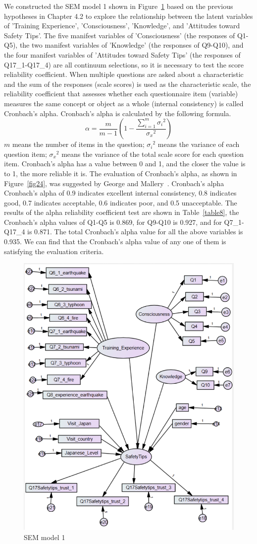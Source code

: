 We constructed the SEM model 1 shown in Figure~\ref{fig23} based on the previous hypotheses in Chapter 4.2 to explore the relationship between the latent variables of 'Training Experience', 'Consciousness', 'Knowledge', and 'Attitudes toward Safety Tips'. The five manifest variables of 'Consciousness' (the responses of Q1-Q5), the two manifest variables of 'Knowledge' (the responses of Q9-Q10), and the four manifest variables of  'Attitudes toward Safety Tips' (the responses of Q17\_1-Q17\_4) are all continuum selections, so it is necessary to test the score reliability coefficient. When multiple questions are asked about a characteristic and the sum of the responses (scale scores) is used as the characteristic scale, the reliability coefficient that assesses whether each questionnaire item (variable) measures the same concept or object as a whole (internal consistency) is called Cronbach's alpha. Cronbach's alpha is calculated by the following formula. 
\begin{equation}
\alpha = \frac{m}{m-1} \left(1 - \frac{\displaystyle \sum_{i = 1}^m{{\sigma_i}^2}}{{\sigma_x}^2} \right)
\end{equation}
$m$ means the number of items in the question; ${\sigma_i}^2$ means the variance of each question item; ${\sigma_x}^2$ means the variance of the total scale score for each question item. Cronbach's alpha has a value between 0 and 1, and the closer the value is to 1, the more reliable it is. The evaluation of Cronbach's alpha, as shown in Figure~\ref{fig24}, was suggested by George and Mallery~\cite{ref1}. Cronbach's alpha  Cronbach's alpha of 0.9 indicates excellent internal consistency, 0.8 indicates good, 0.7 indicates acceptable, 0.6 indicates poor, and 0.5 unacceptable. The results of the alpha reliability coefficient test are shown in Table~\ref{table8}, the Cronbach's alpha values of Q1-Q5 is 0.869, for Q9-Q10 is 0.927, and for Q7\_1-Q17\_4 is 0.871. The total Cronbach's alpha value for all the above variables is 0.935. We can find that the Cronbach's alpha value of any one of them is satisfying the evaluation criteria.

\begin{figure}[h]
  \includegraphics[width=0.5\linewidth]{Figure/Figure23.jpg}
  \centering
  \caption{SEM model 1}
  \label{fig23}
\end{figure}

